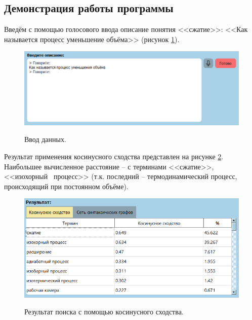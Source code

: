 \newpage

\subsection{Демонстрация работы программы}
Введём с помощью голосового ввода описание понятия <<сжатие>>: <<Как называется процесс уменьшение объёма>> (рисунок \ref{fig43:image}). 
\begin{figure}[h!]
	\begin{center}
		{\includegraphics[scale = 0.6]{img/examples/ex1_1.png}}
		\caption{Ввод данных.}
		\label{fig43:image}
	\end{center}
\end{figure}

Результат применения косинусного сходства представлен на рисунке \ref{fig44:image}. Наибольшее вычисленное расстояние -- с терминами <<сжатие>>, <<изохорный \, процесс>> (т.к. последний -- термодинамический процесс, происходящий при постоянном объёме).
\begin{figure}[h]
	\begin{center}
		{\includegraphics[scale = 0.6]{img/examples/ex1_2.png}}
		\caption{Результат поиска с помощью косинусного сходства.}
		\label{fig44:image}
	\end{center}
\end{figure}

